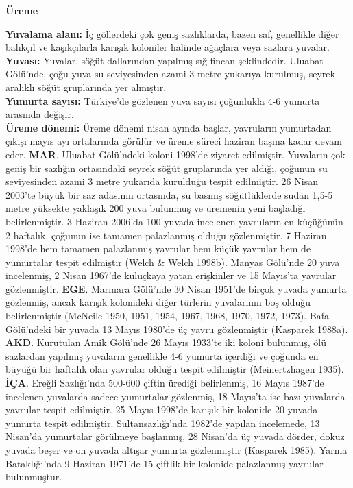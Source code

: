 \documentclass[
  letterpaper,
  DIV=11,
  numbers=noendperiod]{scrreprt}
\begin{document}
\textbf{Üreme}

\textbf{Yuvalama alanı:} İç göllerdeki çok geniş sazlıklarda, bazen saf,
genellikle diğer balıkçıl ve kaşıkçılarla karışık koloniler halinde
ağaçlara veya sazlara yuvalar.\\
\textbf{Yuvası:} Yuvalar, söğüt dallarından yapılmış sığ fincan
şeklindedir. Uluabat Gölü'nde, çoğu yuva su seviyesinden azami 3 metre
yukarıya kurulmuş, seyrek aralıklı söğüt gruplarında yer almıştır.\\
\textbf{Yumurta sayısı:} Türkiye'de gözlenen yuva sayısı çoğunlukla 4-6
yumurta arasında değişir.\\
\textbf{Üreme dönemi:} Üreme dönemi nisan ayında başlar, yavruların
yumurtadan çıkışı mayıs ayı ortalarında görülür ve üreme süreci haziran
başına kadar devam eder. \textbf{MAR}. Uluabat Gölü'ndeki koloni 1998'de
ziyaret edilmiştir. Yuvaların çok geniş bir sazlığın ortasındaki seyrek
söğüt gruplarında yer aldığı, çoğunun su seviyesinden azami 3 metre
yukarıda kurulduğu tespit edilmiştir. 26 Nisan 2003'te büyük bir saz
adasının ortasında, su basmış söğütlüklerde sudan 1,5-5 metre yüksekte
yaklaşık 200 yuva bulunmuş ve üremenin yeni başladığı belirlenmiştir. 3
Haziran 2006'da 100 yuvada incelenen yavruların en küçüğünün 2 haftalık,
çoğunun ise tamamen palazlanmış olduğu gözlenmiştir. 7 Haziran 1998'de
hem tamamen palazlanmış yavrular hem küçük yavrular hem de yumurtalar
tespit edilmiştir (Welch \& Welch 1998b). Manyas Gölü'nde 20 yuva
incelenmiş, 2 Nisan 1967'de kuluçkaya yatan erişkinler ve 15 Mayıs'ta
yavrular gözlenmiştir. \textbf{EGE}. Marmara Gölü'nde 30 Nisan 1951'de
birçok yuvada yumurta gözlenmiş, ancak karışık kolonideki diğer türlerin
yuvalarının boş olduğu belirlenmiştir (McNeile 1950, 1951, 1954, 1967,
1968, 1970, 1972, 1973). Bafa Gölü'ndeki bir yuvada 13 Mayıs 1980'de üç
yavru gözlenmiştir (Kasparek 1988a). \textbf{AKD}. Kurutulan Amik
Gölü'nde 26 Mayıs 1933'te iki koloni bulunmuş, ölü sazlardan yapılmış
yuvaların genellikle 4-6 yumurta içerdiği ve çoğunda en büyüğü bir
haftalık olan yavrular olduğu tespit edilmiştir (Meinertzhagen 1935).
\textbf{İÇA}. Ereğli Sazlığı'nda 500-600 çiftin ürediği belirlenmiş, 16
Mayıs 1987'de incelenen yuvalarda sadece yumurtalar gözlenmiş, 18
Mayıs'ta ise bazı yuvalarda yavrular tespit edilmiştir. 25 Mayıs 1998'de
karışık bir kolonide 20 yuvada yumurta tespit edilmiştir.
Sultansazlığı'nda 1982'de yapılan incelemede, 13 Nisan'da yumurtalar
görülmeye başlanmış, 28 Nisan'da üç yuvada dörder, dokuz yuvada beşer ve
on yuvada altışar yumurta gözlenmiştir (Kasparek 1985). Yarma
Bataklığı'nda 9 Haziran 1971'de 15 çiftlik bir kolonide palazlanmış
yavrular bulunmuştur.
\end{document}
